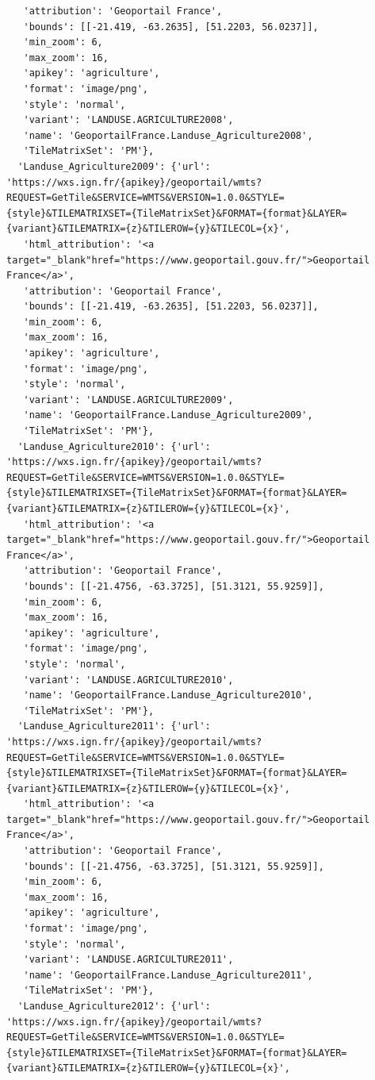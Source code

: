 \documentclass[
  letterpaper,
  DIV=11,
  numbers=noendperiod]{scrreprt}
\begin{document}
\begin{verbatim}
   'attribution': 'Geoportail France',
   'bounds': [[-21.419, -63.2635], [51.2203, 56.0237]],
   'min_zoom': 6,
   'max_zoom': 16,
   'apikey': 'agriculture',
   'format': 'image/png',
   'style': 'normal',
   'variant': 'LANDUSE.AGRICULTURE2008',
   'name': 'GeoportailFrance.Landuse_Agriculture2008',
   'TileMatrixSet': 'PM'},
  'Landuse_Agriculture2009': {'url': 'https://wxs.ign.fr/{apikey}/geoportail/wmts?REQUEST=GetTile&SERVICE=WMTS&VERSION=1.0.0&STYLE={style}&TILEMATRIXSET={TileMatrixSet}&FORMAT={format}&LAYER={variant}&TILEMATRIX={z}&TILEROW={y}&TILECOL={x}',
   'html_attribution': '<a target="_blank"href="https://www.geoportail.gouv.fr/">Geoportail France</a>',
   'attribution': 'Geoportail France',
   'bounds': [[-21.419, -63.2635], [51.2203, 56.0237]],
   'min_zoom': 6,
   'max_zoom': 16,
   'apikey': 'agriculture',
   'format': 'image/png',
   'style': 'normal',
   'variant': 'LANDUSE.AGRICULTURE2009',
   'name': 'GeoportailFrance.Landuse_Agriculture2009',
   'TileMatrixSet': 'PM'},
  'Landuse_Agriculture2010': {'url': 'https://wxs.ign.fr/{apikey}/geoportail/wmts?REQUEST=GetTile&SERVICE=WMTS&VERSION=1.0.0&STYLE={style}&TILEMATRIXSET={TileMatrixSet}&FORMAT={format}&LAYER={variant}&TILEMATRIX={z}&TILEROW={y}&TILECOL={x}',
   'html_attribution': '<a target="_blank"href="https://www.geoportail.gouv.fr/">Geoportail France</a>',
   'attribution': 'Geoportail France',
   'bounds': [[-21.4756, -63.3725], [51.3121, 55.9259]],
   'min_zoom': 6,
   'max_zoom': 16,
   'apikey': 'agriculture',
   'format': 'image/png',
   'style': 'normal',
   'variant': 'LANDUSE.AGRICULTURE2010',
   'name': 'GeoportailFrance.Landuse_Agriculture2010',
   'TileMatrixSet': 'PM'},
  'Landuse_Agriculture2011': {'url': 'https://wxs.ign.fr/{apikey}/geoportail/wmts?REQUEST=GetTile&SERVICE=WMTS&VERSION=1.0.0&STYLE={style}&TILEMATRIXSET={TileMatrixSet}&FORMAT={format}&LAYER={variant}&TILEMATRIX={z}&TILEROW={y}&TILECOL={x}',
   'html_attribution': '<a target="_blank"href="https://www.geoportail.gouv.fr/">Geoportail France</a>',
   'attribution': 'Geoportail France',
   'bounds': [[-21.4756, -63.3725], [51.3121, 55.9259]],
   'min_zoom': 6,
   'max_zoom': 16,
   'apikey': 'agriculture',
   'format': 'image/png',
   'style': 'normal',
   'variant': 'LANDUSE.AGRICULTURE2011',
   'name': 'GeoportailFrance.Landuse_Agriculture2011',
   'TileMatrixSet': 'PM'},
  'Landuse_Agriculture2012': {'url': 'https://wxs.ign.fr/{apikey}/geoportail/wmts?REQUEST=GetTile&SERVICE=WMTS&VERSION=1.0.0&STYLE={style}&TILEMATRIXSET={TileMatrixSet}&FORMAT={format}&LAYER={variant}&TILEMATRIX={z}&TILEROW={y}&TILECOL={x}',

\end{verbatim}
\end{document}
